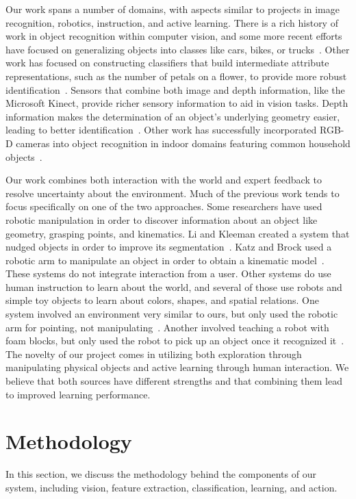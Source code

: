 \documentclass[11pt]{article}
\newcommand{\xxx}[1]{{\bf \color{red} #1}}
\begin{document}
Our work spans a number of domains, with aspects similar to projects in image
recognition, robotics, instruction, and active learning. There is a rich
history of work in object recognition within computer vision, and some more
recent efforts have focused on generalizing objects into classes like cars,
bikes, or trucks~\cite{huber2004parts}. Other work has focused on
constructing classifiers that build intermediate attribute representations,
such as the number of petals on a flower, to provide more robust
identification~\cite{nilsback2006visual,gehler2009feature}.
Sensors that combine both image and depth information, like the Microsoft Kinect,
provide richer sensory information to aid in vision tasks. Depth information
makes the determination of an object's underlying geometry easier,
leading to better identification~\cite{marton2010hierarchical}. Other
work has successfully incorporated RGB-D cameras into object
recognition in indoor domains featuring common household
objects~\cite{marton2010hierarchical,lai2011sparse}.

Our work combines both interaction with the world and expert feedback to
resolve uncertainty about the environment. Much of the previous work tends to focus
specifically on one of the two approaches.
Some researchers have used robotic manipulation in order to discover
information about an object like geometry, grasping points, and kinematics. Li
and Kleeman created a system that nudged objects in order to improve its
segmentation~\cite{li2008autonomous}. Katz and Brock used a robotic arm to
manipulate an object in order to obtain a kinematic
model~\cite{katz2008manipulating}.
These systems do not integrate interaction from
a user. Other systems do use human instruction to learn about the world, and
several of those use robots and simple toy objects to learn about colors,
shapes, and spatial relations. One system involved an environment very
similar to ours, but only used the robotic arm for pointing, not
manipulating~\cite{skocaj2007system}. Another involved teaching a
robot with foam blocks, but only used the robot to pick up an object
once it recognized it~\cite{zambuto2010visually}. The novelty of our
project comes in utilizing both exploration through manipulating
physical objects and active learning through human interaction. We
believe that both sources have different strengths and that combining
them lead to improved learning performance.

\section{Methodology}
In this section, we discuss the methodology behind the components of our
system, including vision, feature extraction, classification, learning, and
action.
\end{document}
